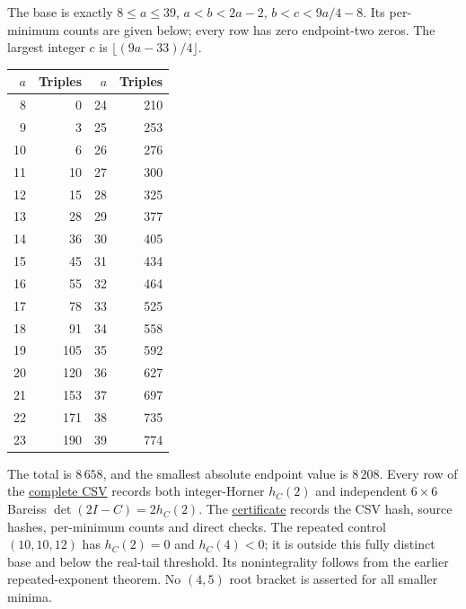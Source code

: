 The base is exactly $8\leq a\leq39$, $a<b<2a-2$,
$b<c<9a/4-8$. Its per-minimum counts are given below; every row has
zero endpoint-two zeros. The largest integer $c$ is
$\lfloor(9a-33)/4\rfloor$.
\begin{center}
\begin{tabular}{rrrr}
\toprule
$a$ & Triples & $a$ & Triples \\
\midrule
8 & 0 & 24 & 210 \\
9 & 3 & 25 & 253 \\
10 & 6 & 26 & 276 \\
11 & 10 & 27 & 300 \\
12 & 15 & 28 & 325 \\
13 & 28 & 29 & 377 \\
14 & 36 & 30 & 405 \\
15 & 45 & 31 & 434 \\
16 & 55 & 32 & 464 \\
17 & 78 & 33 & 525 \\
18 & 91 & 34 & 558 \\
19 & 105 & 35 & 592 \\
20 & 120 & 36 & 627 \\
21 & 153 & 37 & 697 \\
22 & 171 & 38 & 735 \\
23 & 190 & 39 & 774 \\
\bottomrule
\end{tabular}
\end{center}
The total is $8\,658$, and the smallest absolute endpoint value is
$8\,208$. Every row of the
\href{https://github.com/the-omega-institute/ideal-intersection-laplacian/blob/4afe151e1dc7193e6776cc1b08d3606aa804238e/results/endpoint-two-completion-base.csv}{complete CSV}
records both integer-Horner $h_C(2)$ and independent
$6\times6$ Bareiss $\det(2I-C)=2h_C(2)$. The
\href{https://github.com/the-omega-institute/ideal-intersection-laplacian/blob/4afe151e1dc7193e6776cc1b08d3606aa804238e/results/endpoint-two-completion.json}{certificate}
records the CSV hash, source hashes, per-minimum counts and direct checks.
The repeated control $(10,10,12)$ has $h_C(2)=0$ and $h_C(4)<0$;
it is outside this fully distinct base and below the real-tail threshold.
Its nonintegrality follows from the earlier repeated-exponent theorem.
No $(4,5)$ root bracket is asserted for all smaller minima.
